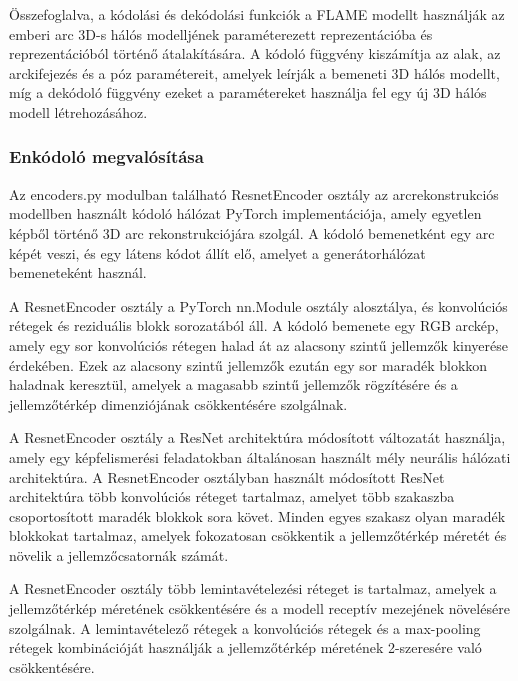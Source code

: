\documentclass[12pt,a4]{article}
\begin{document}
\begin{enumerate}
\begin{enumerate}
        \end{enumerate}

        Összefoglalva, a kódolási és dekódolási funkciók a FLAME modellt használják az emberi arc 3D-s hálós modelljének paraméterezett reprezentációba és reprezentációból történő átalakítására. 
A kódoló függvény kiszámítja az alak, az arckifejezés és a póz paramétereit, amelyek leírják a bemeneti 3D hálós modellt, míg a dekódoló függvény ezeket a paramétereket használja fel egy új 3D hálós modell létrehozásához.

    \end{enumerate}

     \subsubsection{Enkódoló megvalósítása}
    Az encoders.py modulban található ResnetEncoder osztály az arcrekonstrukciós modellben használt kódoló hálózat PyTorch implementációja, amely egyetlen képből történő 3D arc rekonstrukciójára szolgál. 
 A kódoló bemenetként egy arc képét veszi, és egy látens kódot állít elő, amelyet a generátorhálózat bemeneteként használ.

A ResnetEncoder osztály a PyTorch nn.Module osztály alosztálya, és konvolúciós rétegek és reziduális blokk sorozatából áll.
 A kódoló bemenete egy RGB arckép, amely egy sor konvolúciós rétegen halad át az alacsony szintű jellemzők kinyerése érdekében.
 Ezek az alacsony szintű jellemzők ezután egy sor maradék blokkon haladnak keresztül, amelyek a magasabb szintű jellemzők rögzítésére és a jellemzőtérkép dimenziójának csökkentésére szolgálnak.

A ResnetEncoder osztály a ResNet architektúra módosított változatát használja, amely egy képfelismerési feladatokban általánosan használt mély neurális hálózati architektúra.
 A ResnetEncoder osztályban használt módosított ResNet architektúra több konvolúciós réteget tartalmaz, amelyet több szakaszba csoportosított maradék blokkok sora követ.
 Minden egyes szakasz olyan maradék blokkokat tartalmaz, amelyek fokozatosan csökkentik a jellemzőtérkép méretét és növelik a jellemzőcsatornák számát.

A ResnetEncoder osztály több lemintavételezési réteget is tartalmaz, amelyek a jellemzőtérkép méretének csökkentésére és a modell receptív mezejének növelésére szolgálnak.
A lemintavételező rétegek a konvolúciós rétegek és a max-pooling rétegek kombinációját használják a jellemzőtérkép méretének 2-szeresére való csökkentésére.
\end{document}
